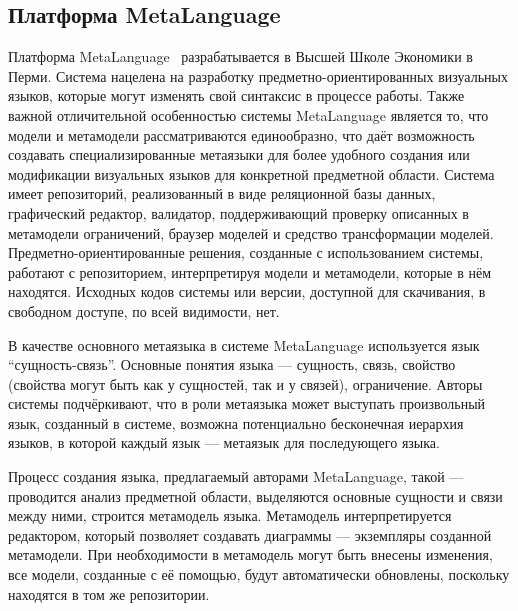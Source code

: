 \subsection{Платформа MetaLanguage}
Платформа MetaLanguage~\cite{sukhov2012approach, lyadova2008language, lyadova2010instruments, sukhov2013disser}
разрабатывается в Высшей Школе Экономики в Перми. Система нацелена на разработку предметно-ориентированных
визуальных языков, которые могут изменять свой синтаксис в процессе работы. Также важной
отличительной особенностью системы MetaLanguage является то, что модели и метамодели рассматриваются
единообразно, что даёт возможность создавать специализированные метаязыки для более удобного
создания или модификации визуальных языков для конкретной предметной области. Система
имеет репозиторий, реализованный в виде реляционной базы данных, графический редактор, валидатор,
поддерживающий проверку описанных в метамодели ограничений, браузер моделей и средство трансформации
моделей. Предметно-ориентированные решения, созданные с использованием системы, работают
с репозиторием, интерпретируя модели и метамодели, которые в нём находятся. Исходных кодов системы 
или версии, доступной для скачивания, в свободном доступе, по всей видимости, нет.

В качестве основного метаязыка в системе MetaLanguage используется язык "`сущность-связь"'. Основные понятия языка ---
сущность, связь, свойство (свойства могут быть как у сущностей, так и у связей), ограничение.
Авторы системы подчёркивают, что в роли метаязыка может выступать произвольный язык, созданный в системе,
возможна потенциально бесконечная иерархия языков, в которой каждый язык ---
метаязык для последующего языка.

Процесс создания языка, предлагаемый авторами MetaLanguage, такой --- проводится анализ 
предметной области, выделяются основные сущности и связи между ними, строится метамодель языка.
Метамодель интерпретируется редактором, который позволяет создавать диаграммы --- экземпляры
созданной метамодели. При необходимости в метамодель могут быть внесены изменения, все 
модели, созданные с её помощью, будут автоматически обновлены, поскольку находятся в том же репозитории.

